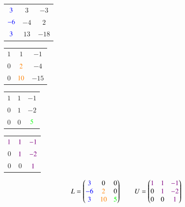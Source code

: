 \begin{minipage}{0.25\columnwidth}
	\begin{tabular}{|c c c|}
		\hline
		${\color{blue}3}$	& $3$  & $-3$ 	\\
		${\color{blue}-6}$ 	& $-4$ & $2$ 	\\
		${\color{blue}3}$	& $13$ & $-18$ 	\\
		\hline
	\end{tabular}
\end{minipage}	
\hfill
\begin{minipage}{0.23\columnwidth}
	\begin{tabular}{|c c c|}
		\hline
		$1$ & $1$ 			& $-1$  \\
		$0$ & ${\color{orange}2}$ 	& $-4$  \\
		$0$ & ${\color{orange}10}$ 	& $-15$ \\
		\hline
	\end{tabular}
\end{minipage}		
\hfill
\begin{minipage}{0.21\columnwidth}
	\begin{tabular}{|c c c|}
		\hline
		$1$ & $1$ & $-1$		\\
		$0$ & $1$ & $-2$ 		\\
		$0$ & $0$ & ${\color{green}5}$ 	\\
		\hline
	\end{tabular}
\end{minipage}	
\hfill
\begin{minipage}{0.23\columnwidth}
	\begin{tabular}{|c c c|}
		\hline
		${\color{violet}1}$	& ${\color{violet}1}$	& ${\color{violet}-1}$	\\
		$0$ 		& ${\color{violet}1}$ & ${\color{violet}-2}$ 	\\
		$0$ 		& $0$ 		& ${\color{violet}1}$ 	\\
		\hline
	\end{tabular}
\end{minipage}	

\vspace{0.2cm}

$$ L = \begin{pmatrix} 
	{\color{blue}3} & 0 & 0 \\ {\color{blue}-6} & {\color{orange}2} & 0 \\ {\color{blue}3} & {\color{orange}10} & {\color{green}5}
\end{pmatrix}
\qquad 
U = \begin{pmatrix} 
	{\color{violet}1} & {\color{violet}1} & {\color{violet}-1} \\ 0 & {\color{violet}1} & {\color{violet}-2} \\ 0 & 0 & {\color{violet}1}  
\end{pmatrix} $$


